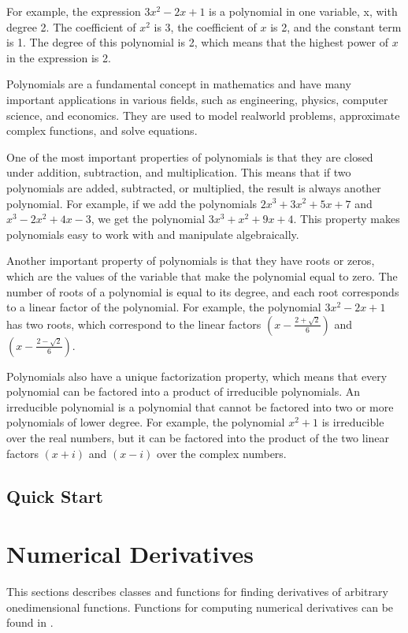 \documentclass[letterpaper,10pt,english]{sphinxmanual}
\begin{document}
\sphinxAtStartPar
For example, the expression \(3x^2 - 2x + 1\) is a polynomial in one variable, x, with degree 2. The coefficient of \(x^2\) is 3, the coefficient of \(x\) is \sphinxhyphen{}2, and the constant term is 1. The degree of this polynomial is 2, which means that the highest power of \(x\) in the expression is 2.

\sphinxAtStartPar
Polynomials are a fundamental concept in mathematics and have many important applications in various fields, such as engineering, physics, computer science, and economics. They are used to model real\sphinxhyphen{}world problems, approximate complex functions, and solve equations.

\sphinxAtStartPar
One of the most important properties of polynomials is that they are closed under addition, subtraction, and multiplication. This means that if two polynomials are added, subtracted, or multiplied, the result is always another polynomial. For example, if we add the polynomials \(2x^3 + 3x^2 + 5x + 7\) and \(x^3 - 2x^2 + 4x - 3\), we get the polynomial \(3x^3 + x^2 + 9x + 4\). This property makes polynomials easy to work with and manipulate algebraically.

\sphinxAtStartPar
Another important property of polynomials is that they have roots or zeros, which are the values of the variable that make the polynomial equal to zero. The number of roots of a polynomial is equal to its degree, and each root corresponds to a linear factor of the polynomial. For example, the polynomial \(3x^2 - 2x + 1\) has two roots, which correspond to the linear factors \((x - \frac{2 + \sqrt{2}}{6})\) and \((x - \frac{2 - \sqrt{2}}{6})\).

\sphinxAtStartPar
Polynomials also have a unique factorization property, which means that every polynomial can be factored into a product of irreducible polynomials. An irreducible polynomial is a polynomial that cannot be factored into two or more polynomials of lower degree. For example, the polynomial \(x^2 + 1\) is irreducible over the real numbers, but it can be factored into the product of the two linear factors \((x + i)\) and \((x - i)\) over the complex numbers.


\section{Quick Start}
\label{\detokenize{docPolynomial:quick-start}}
\sphinxstepscope


\chapter{Numerical Derivatives}
\label{\detokenize{docDerivative:numerical-derivatives}}\label{\detokenize{docDerivative::doc}}
\sphinxAtStartPar
This sections describes classes and functions for finding derivatives of arbitrary one\sphinxhyphen{}dimensional functions. Functions for computing numerical derivatives can be found in .
\end{document}
